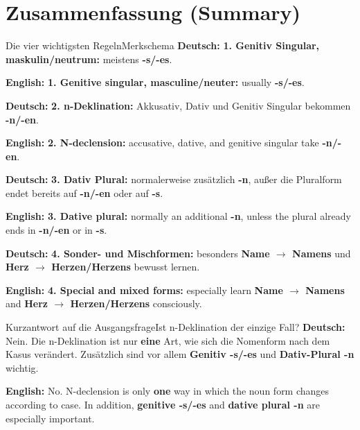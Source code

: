 \documentclass[a4paper,11pt]{article}
\newcommand{\GermanText}[1]{\textbf{Deutsch: }#1\par}
\newcommand{\EnglishText}[1]{{\small\color{SoftGray}\textbf{English: }#1\par}}
\begin{document}
\section{Zusammenfassung \textnormal{(Summary)}}
\begin{grammarentry}{Die vier wichtigsten Regeln}{Merkschema}
\GermanText{\textbf{1. Genitiv Singular, maskulin/neutrum:} meistens \textbf{-s/-es}.}
\EnglishText{\textbf{1. Genitive singular, masculine/neuter:} usually \textbf{-s/-es}.}

\GermanText{\textbf{2. n-Deklination:} Akkusativ, Dativ und Genitiv Singular bekommen \textbf{-n/-en}.}
\EnglishText{\textbf{2. N-declension:} accusative, dative, and genitive singular take \textbf{-n/-en}.}

\GermanText{\textbf{3. Dativ Plural:} normalerweise zusätzlich \textbf{-n}, außer die Pluralform endet bereits auf \textbf{-n/-en} oder auf \textbf{-s}.}
\EnglishText{\textbf{3. Dative plural:} normally an additional \textbf{-n}, unless the plural already ends in \textbf{-n/-en} or in \textbf{-s}.}

\GermanText{\textbf{4. Sonder- und Mischformen:} besonders \textbf{Name $\rightarrow$ Namens} und \textbf{Herz $\rightarrow$ Herzen/Herzens} bewusst lernen.}
\EnglishText{\textbf{4. Special and mixed forms:} especially learn \textbf{Name $\rightarrow$ Namens} and \textbf{Herz $\rightarrow$ Herzen/Herzens} consciously.}
\end{grammarentry}

\begin{grammarentry}{Kurzantwort auf die Ausgangsfrage}{Ist n-Deklination der einzige Fall?}
\GermanText{Nein. Die n-Deklination ist nur \textbf{eine} Art, wie sich die Nomenform nach dem Kasus verändert. Zusätzlich sind vor allem \textbf{Genitiv -s/-es} und \textbf{Dativ-Plural -n} wichtig.}
\EnglishText{No. N-declension is only \textbf{one} way in which the noun form changes according to case. In addition, \textbf{genitive -s/-es} and \textbf{dative plural -n} are especially important.}
\end{grammarentry}
\end{document}
